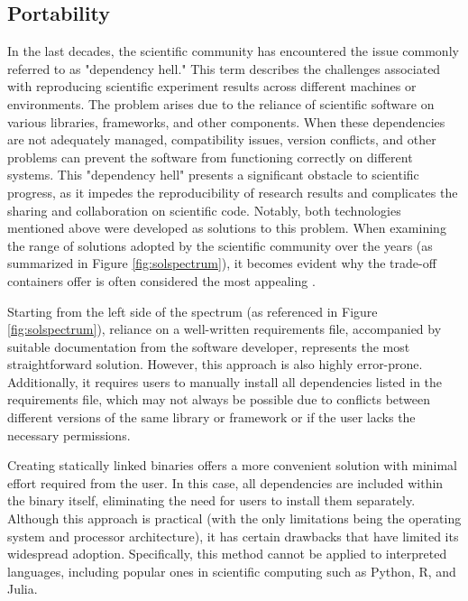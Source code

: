\subsection{Portability}\label{subsec:chpt1-portability}

In the last decades, the scientific community has encountered the issue commonly
referred to as "dependency hell." This term describes the challenges associated
with reproducing scientific experiment results across different machines or
environments. The problem arises due to the reliance of scientific software on
various libraries, frameworks, and other components. When these dependencies are
not adequately managed, compatibility issues, version conflicts, and other
problems can prevent the software from functioning correctly on different
systems. This "dependency hell" presents a significant obstacle to scientific
progress, as it impedes the reproducibility of research results and complicates
the sharing and collaboration on scientific code. Notably, both technologies
mentioned above were developed as solutions to this problem.
When examining the range of solutions adopted by the scientific community over
the years (as summarized in Figure \ref{fig:solspectrum}), it becomes evident
why the trade-off containers offer is often considered the most appealing
\cite{sarusso}.

Starting from the left side of the spectrum (as referenced in Figure
\ref{fig:solspectrum}), reliance on a well-written requirements file,
accompanied by suitable documentation from the software developer, represents
the most straightforward solution. However, this approach is also highly
error-prone. Additionally, it requires users to manually install all
dependencies listed in the requirements file, which may not always be possible
due to conflicts between different versions of the same library or framework or
if the user lacks the necessary permissions.

Creating statically linked binaries offers a more convenient solution with
minimal effort required from the user. In this case, all dependencies are
included within the binary itself, eliminating the need for users to install
them separately. Although this approach is practical (with the only limitations
being the operating system and processor architecture), it has certain drawbacks
that have limited its widespread adoption. Specifically, this method cannot be
applied to interpreted languages, including popular ones in scientific computing
such as Python, R, and Julia.

